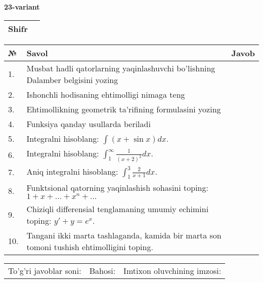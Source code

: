 \documentclass{article}
\begin{document}
  \egroup
  
  \newpage
  
  
  \textbf{23-variant}\\
  
  \bgroup
  \def\arraystretch{1.6} %
  
  \begin{tabular}{|m{5.7cm}|m{9.5cm}|}
  \hline
  Shifr & \\
  \hline
  \end{tabular}
  
  \vspace{1cm}
  
  \begin{tabular}{|m{0.7cm}|m{10cm}|m{4cm}|}
  \hline
  № & Savol & Javob \\
  \hline
  1. & Musbat hadli qatorlarning yaqinlashuvchi bo'lishning Dalamber belgisini yozing &  \\
  \hline
  2. & Ishonchli hodisaning ehtimolligi nimaga teng &  \\
  \hline
  3. & Ehtimollikning geometrik ta'rifining formulasini yozing &  \\
  \hline
  4. & Funksiya qanday usullarda beriladi &  \\
  \hline
  5. & Integralni hisoblang: \(\int {(x + \sin x)dx}\). &  \\
  \hline
  6. & Integralni hisoblang: \(\int_{1}^{\infty}{\frac{1}{(x + 2)^{2}}dx}\). &  \\
  \hline
  7. & Aniq integralni hisoblang: \(\int_{1}^{3}\frac{2}{x + 1}dx\). &  \\
  \hline
  8. & Funktsional qatorning yaqinlashish sohasini toping:\(1 + x + ... + x^{n} + ...\) &  \\
  \hline
  9. & Chiziqli differensial tenglamaning umumiy echimini toping: \(y' + y = e^{x}\). &  \\
  \hline
  10. & Tangani ikki marta tashlaganda, kamida bir marta son tomoni tushish ehtimolligini toping. &  \\
  \hline
  \end{tabular}
  
  \vspace{1cm}
  
  \begin{tabular}{lll}
  To'g'ri javoblar soni: \underline{\hspace{1.5cm}} & 
  Bahosi: \underline{\hspace{1.5cm}} & 
  Imtixon oluvchining imzosi: \underline{\hspace{2cm}} \\
  \end{tabular}
  
\end{document}
